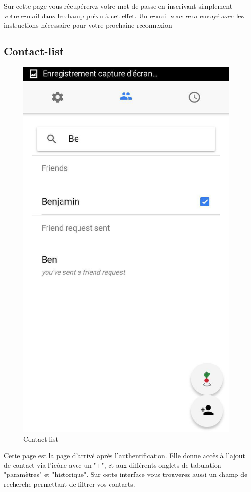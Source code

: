 \documentclass[french]{article}
\begin{document}
	Sur cette page vous récupérerez votre mot de passe en inscrivant simplement votre e-mail dans le champ prévu à cet effet. Un e-mail vous sera envoyé avec les instructions nécessaire pour votre prochaine reconnexion.
	
	\subsection{Contact-list}
	\begin{figure}[H]
		\centering
		\includegraphics[scale=0.4]{../screenshot/screenshot-contact-list2}
		\caption{Contact-list}
		\label{Contact-list}
	\end{figure} 
	Cette page est la page d'arrivé après l'authentification. Elle donne accès à l'ajout de contact via l'icône avec un "+", et aux différents onglets de tabulation "paramètres" et "historique". Sur cette interface vous trouverez aussi un champ de recherche permettant de filtrer vos contacts.
	
\end{document}

